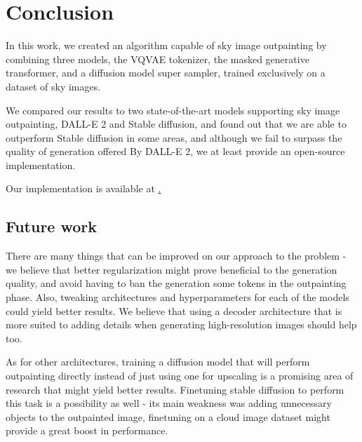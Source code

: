 \chapter*{Conclusion}

In this work, we created an algorithm capable of sky image outpainting by combining three models, the VQVAE tokenizer, the masked generative transformer, and a diffusion model super sampler, trained exclusively on a dataset of sky images.

We compared our results to two state-of-the-art models supporting sky image outpainting, DALL-E 2 and Stable diffusion, and found out that we are able to outperform Stable diffusion in some areas, and although we fail to surpass the quality of generation offered By DALL-E 2, we at least provide an open-source implementation.

Our implementation is available at \href{https://github.com/Matezzzz/Image_outpainting}.

\section{Future work}

There are many things that can be improved on our approach to the problem - we believe that better regularization might prove beneficial to the generation quality, and avoid having to ban the generation some tokens in the outpainting phase. Also, tweaking architectures and hyperparameters for each of the models could yield better results. We believe that using a decoder architecture that is more suited to adding details when generating high-resolution images should help too.

As for other architectures, training a diffusion model that will perform outpainting directly instead of just using one for upscaling is a promising area of research that might yield better results. Finetuning stable diffusion to perform this task is a possibility as well - its main weakness was adding unnecessary objects to the outpainted image, finetuning on a cloud image dataset might provide a great boost in performance.